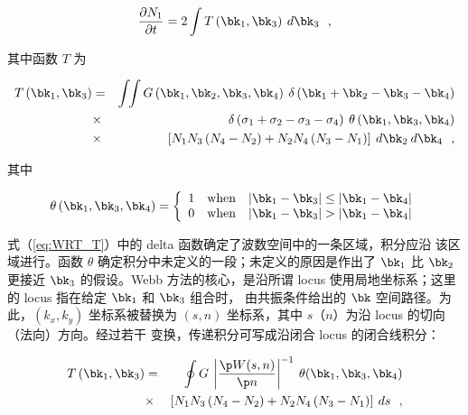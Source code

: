\begin{equation}
{{\partial N_1 } \over {\partial t}} = 2\int T\left( {\bk_1 ,\bk_3 }
\right) \: d\bk_3  \:\:\: ,
\end{equation}

\noindent
其中函数 $T$ 为

\begin{eqnarray}
T \left( \bk_1 ,\bk_3 \right) & = & \int\!\!\int
G\left( \bk_1 ,\bk_2, \bk_3 ,\bk_4 \right) \: \delta \left( \bk_1  +
\bk_2  - \bk_3  - \bk_4 \right) \nonumber \\
& \times & \delta \left( {\sigma _1  + \sigma _2  - \sigma _3  -
\sigma _4 }
\right) \: \theta \left ( \bk_1 , \bk_3 , \bk_4 \right )
\nonumber \\
& \times & \left [ N_1 N_3 \left ( N_4 - N_2 \right ) + N_2 N_4 \left
(
N_3  - N_1 \right ) \right ] \: d\bk_2 \: d\bk_4 \:\:\: ,
\label{eq:WRT_T}
\end{eqnarray}

\noindent
其中

\begin{equation}
\theta \left( {\bk_1 ,\bk_3 ,\bk_4 } \right) = \left\{ {\begin{array}{*{20}c}
   1 & {\rm{when}} & {\left| {\bk_1  - \bk_3 } \right| \leq \left| {\bk_1  - \bk_4 } \right|}  \\
   0 & {\rm{when}} & {\left| {\bk_1  - \bk_3 } \right| > \left| {\bk_1  - \bk_4 } \right|}  \\
 \end{array} } \right.
\end{equation}

式（\ref{eq:WRT_T}）中的 delta 函数确定了波数空间中的一条区域，积分应沿
该区域进行。函数 $\theta$ 确定积分中未定义的一段；未定义的原因是作出了
$\bk_1$ 比 $\bk_2$ 更接近 $\bk_3$ 的假设。Webb 方法的核心，是沿所谓
locus 使用局地坐标系；这里的 locus 指在给定 $\bk_1$ 和 $\bk_3$ 组合时，
由共振条件给出的 $\bk$ 空间路径。为此，$(k_{x},k_{y})$ 坐标系被替换为
$(s,n)$ 坐标系，其中 $s$（$n$）为沿 locus 的切向（法向）方向。经过若干
变换，传递积分可写成沿闭合 locus 的闭合线积分：

\begin{eqnarray}
T \left( \bk_1 ,\bk_3 \right) & = & \oint G \:
\left | \frac{\p W(s,n)}{\p n}\right | ^{-1}
\: \theta ( \bk_1 , \bk_3 , \bk_4 ) \nonumber \\
& \times & \left [ N_1 N_3 \left ( N_4 - N_2 \right ) + N_2 N_4 \left
(
N_3  - N_1 \right ) \right ] \: d s  \:\:\: , \label{eq:WRT_T2}
\end{eqnarray}

